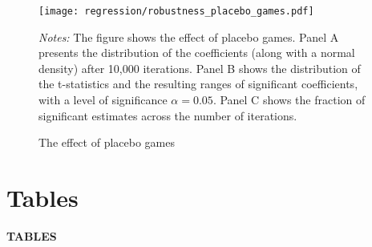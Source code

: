 \documentclass[11pt, a4paper]{article} %
\begin{document}
\vspace*{\fill}
\begin{figure}[H]\centering
	\caption{The effect of placebo games}\label{fig_soc_ext:robustness_placebo_games}
	\texttt{[image: regression/robustness\_placebo\_games.pdf]}
	\begin{minipage}{0.95\linewidth}
		\scriptsize{\emph{Notes:} The figure shows the effect of placebo games. Panel A presents the distribution of the coefficients (along with a normal density) after 10,000 iterations. Panel B shows the distribution of the t-statistics and the resulting ranges of significant coefficients, with a level of significance $\alpha=0.05$. Panel C shows the fraction of significant estimates across the number of iterations.}
	\end{minipage}
\end{figure}
\vspace*{\fill}\clearpage






\newpage
\TODO\section{Tables}
\vspace*{\fill}
{\Huge \begin{center}\textbf{TABLES}\end{center}}
\vspace*{\fill}\clearpage
\end{document}
